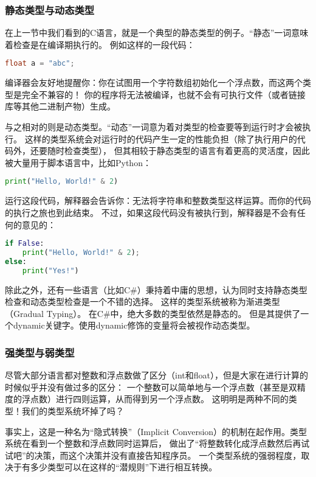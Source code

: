 \documentclass[../main.tex]{subfiles}
\begin{document}
  \subsubsection*{静态类型与动态类型}
  \indent 在上一节中我们看到的C语言，就是一个典型的静态类型的例子。“静态”一词意味着检查是在编译期执行的。
  例如这样的一段代码：

\begin{lstlisting}[language=c]
float a = "abc";
\end{lstlisting}

  \indent 编译器会友好地提醒你：你在试图用一个字符数组初始化一个浮点数，而这两个类型是完全不兼容的！
  你的程序将无法被编译，也就不会有可执行文件（或者链接库等其他二进制产物）生成。

  \indent 与之相对的则是动态类型。“动态”一词意为着对类型的检查要等到运行时才会被执行。
  这样的类型系统会对运行时的代码产生一定的性能负担（除了执行用户的代码外，还要随时检查类型），
  但其相较于静态类型的语言有着更高的灵活度，因此被大量用于脚本语言中，比如Python：

\begin{lstlisting}[language=python]
print("Hello, World!" & 2)
\end{lstlisting}

  运行这段代码，解释器会告诉你：无法将字符串和整数类型这样运算。而你的代码的执行之旅也到此结束。
  不过，如果这段代码没有被执行到，解释器是不会有任何的意见的：

\begin{lstlisting}[language=python]
if False:
	print("Hello, World!" & 2);
else:
	print("Yes!")
\end{lstlisting}

  \indent 除此之外，还有一些语言（比如C\#）秉持着中庸的思想，认为同时支持静态类型检查和动态类型检查是一个不错的选择。
  这样的类型系统被称为渐进类型（Gradual Typing）。 \cite{gradualwiki} 在C\#中，绝大多数的类型依然是静态的。
  但是其提供了一个dynamic关键字。使用dynamic修饰的变量将会被视作动态类型。

  \subsubsection*{强类型与弱类型}
  \indent 尽管大部分语言都对整数和浮点数做了区分（int和float），但是大家在进行计算的时候似乎并没有做过多的区分：
  一个整数可以简单地与一个浮点数（甚至是双精度的浮点数）进行四则运算，从而得到另一个浮点数。
  这明明是两种不同的类型！我们的类型系统坏掉了吗？

  \indent 事实上，这是一种名为“隐式转换”（Implicit Conversion）的机制在起作用。类型系统在看到一个整数和浮点数同时运算后，
  做出了“将整数转化成浮点数然后再试试吧”的决策，而这个决策并没有直接告知程序员。
  一个类型系统的强弱程度，取决于有多少类型可以在这样的“潜规则”下进行相互转换。
\end{document}

